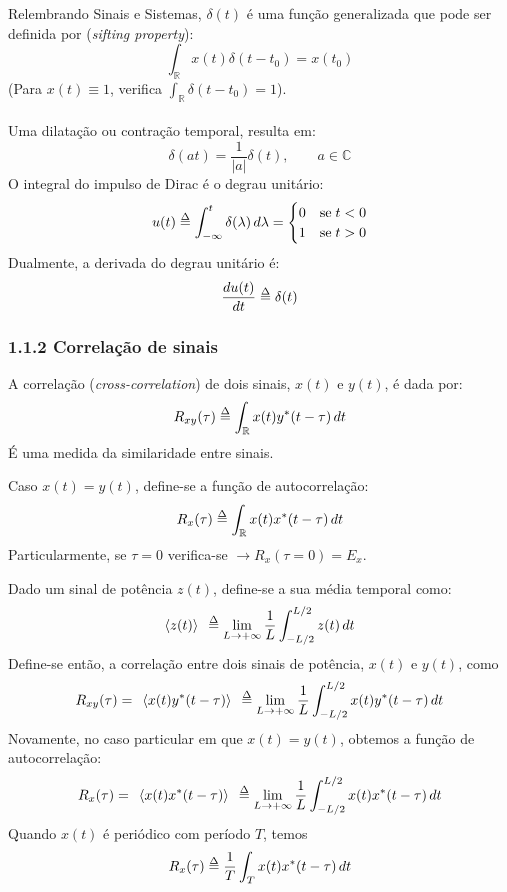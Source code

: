 \noindent Relembrando Sinais e Sistemas, $\delta(t)$ é uma função generalizada que pode ser definida por (\textit{sifting property}):
$$
    \int_{\mathbb{R}} x(t)\delta(t-t_0) = x(t_0)
$$
(Para $x(t) \equiv 1$, verifica $\int_{\mathbb{R}} \delta(t-t_0) = 1$).
\\\\
Uma dilatação ou contração temporal, resulta em:
$$
    \delta(at) = \frac{1}{|a|}\delta(t), \qquad a \in \mathbb{C}
$$
O integral do impulso de Dirac é o degrau unitário:
$$
    u(t) \delequal \int_{-\infty}^{t} \delta(\lambda)\, d\lambda =
    \begin{cases}
        0 & \text{se}\; t < 0 \\
        1 & \text{se}\; t > 0
    \end{cases}
$$
Dualmente, a derivada do degrau unitário é:
$$
    \frac{d u(t)}{dt} \delequal \delta(t)
$$

\subsubsection{1.1.2 Correlação de sinais}
\label{subsubsec:correlation-of-two-signals}

A correlação (\textit{cross-correlation}) de dois sinais, $x(t)$ e $y(t)$, é dada por:
$$
    R_{xy}(\tau) \delequal \int_{\mathbb{R}} x(t)y^{*}(t-\tau)\, dt
$$
É uma medida da similaridade entre sinais. 

Caso $x(t) = y(t)$, define-se a função de autocorrelação:
$$
    R_{x}(\tau) \delequal \int_{\mathbb{R}} x(t)x^{*}(t-\tau)\, dt
$$
Particularmente, se $\tau = 0$ verifica-se $\rightarrow R_{x}(\tau = 0) = E_x$. 

\vspace{-1em}
\noindent{\begin{center}\rule{8cm}{1pt} \end{center}} 

\vspace{-0.5em}
\noindent Dado um sinal de potência $z(t)$, define-se a sua média temporal como:
$$
    \left<z(t)\right>\;\, \delequal \lim_{L\to +\infty} \frac{1}{L} \int_{-L/2}^{L/2} z(t)\, dt 
$$
Define-se então, a correlação entre dois sinais de potência, $x(t)$ e $y(t)$, como 
$$
    R_{xy}(\tau) =\;\, \left<x(t)y^{*}(t-\tau)\right>\;\, \delequal \lim_{L\to +\infty} \frac{1}{L} \int_{-L/2}^{L/2} x(t)y^{*}(t-\tau)\, dt 
$$
Novamente, no caso particular em que $x(t) = y(t)$, obtemos a função de autocorrelação:
$$
    R_{x}(\tau) =\;\, \left<x(t)x^{*}(t-\tau)\right>\;\, \delequal  \lim_{L\to +\infty} \frac{1}{L} \int_{-L/2}^{L/2} x(t)x^{*}(t-\tau)\, dt 
$$
Quando $x(t)$ é periódico com período $T$, temos
$$
    R_{x}(\tau) \delequal \frac{1}{T} \int_{T} x(t)x^{*}(t-\tau)\, dt 
$$

